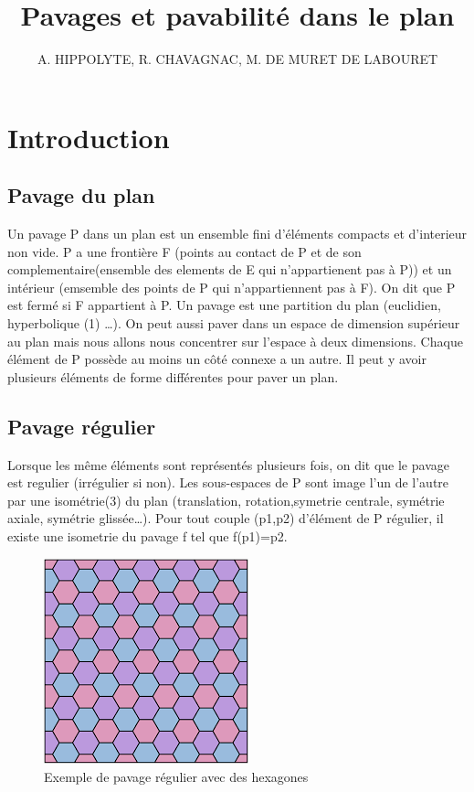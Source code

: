 \documentclass{article}
\title{Pavages et pavabilité dans le plan}
\author{A. HIPPOLYTE, R. CHAVAGNAC, M. DE MURET DE LABOURET}
\begin{document}
\maketitle

\tableofcontents

\section{Introduction}

\subsection{Pavage du plan}

Un pavage P dans un plan est un ensemble fini d'éléments compacts et d’interieur non vide.
P a une frontière F (points au contact de P et de son complementaire(ensemble des elements de E qui n'appartienent pas à P)) et un intérieur (emsemble des points de P qui n'appartiennent pas à F).
On dit que P est fermé si F appartient à P.
Un pavage est une partition du plan (euclidien, hyperbolique (1) …).
On peut aussi paver dans un espace de dimension supérieur au plan mais nous allons nous concentrer sur l’espace à deux dimensions.
Chaque élément de P possède au moins un côté connexe a un autre.
Il peut y avoir plusieurs éléments de forme différentes pour paver un plan.

\subsection{Pavage régulier}

Lorsque les même éléments sont représentés plusieurs fois, on dit que le pavage est regulier (irrégulier si non).
Les sous-espaces de P sont image l’un de l’autre par une isométrie(3) du plan (translation, rotation,symetrie centrale, symétrie axiale, symétrie glissée…).
Pour tout couple (p1,p2) d'élément de P régulier, il existe une isometrie du pavage f tel que f(p1)=p2.

\begin{figure} [h]
    \center
    \includegraphics [scale=0.5] {image/pavage_hexagonal.png}
    \caption{Exemple de pavage régulier avec des hexagones}
\end{figure}
\end{document}
